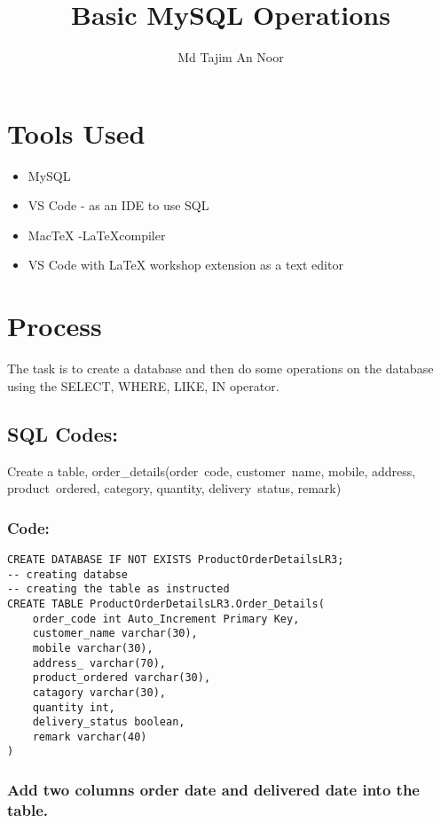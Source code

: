 \documentclass[12pt]{article}
\title{Basic MySQL Operations}
\author{Md Tajim An Noor}
\date{}
\begin{document}

\pagebreak

\tableofcontents

\maketitle

\section{Tools Used}
\begin{itemize}
    \item MySQL
    \item VS Code - as an IDE to use SQL
    \item MacTeX -\LaTeX  compiler
    \item VS Code with LaTeX workshop extension as a text editor
\end{itemize}


\section{Process}
The task is to create a database and then do some operations on the database using the SELECT, WHERE, LIKE, IN operator.

\subsection{SQL Codes:}
Create a table, order\_details(order\ code, customer\ name, mobile, address, product\ ordered, category, quantity, delivery\ status, remark)
\subsubsection*{Code:}
\begin{verbatim}
CREATE DATABASE IF NOT EXISTS ProductOrderDetailsLR3;
-- creating databse
-- creating the table as instructed
CREATE TABLE ProductOrderDetailsLR3.Order_Details(
    order_code int Auto_Increment Primary Key,
    customer_name varchar(30),
    mobile varchar(30),
    address_ varchar(70),
    product_ordered varchar(30),
    catagory varchar(30),
    quantity int,
    delivery_status boolean,
    remark varchar(40)
)
\end{verbatim}
\vspace{10mm}

\subsubsection{Add two columns order date and delivered date into the table.}
\end{document}
